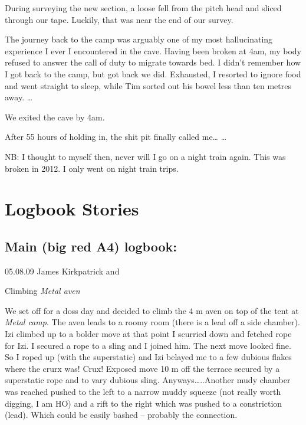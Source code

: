 During surveying the new section, a loose fell from the pitch head and
sliced through our tape. Luckily, that was near the end of our survey.

The journey back to the camp was arguably one of my most hallucinating
experience I ever I encountered in the cave. Having been broken at 4am,
my body refused to answer the call of duty to migrate towards bed. I
didn't remember how I got back to the camp, but got back we did.
Exhausted, I resorted to ignore food and went straight to sleep, while
Tim sorted out his bowel less than ten metres away. \ldots{}

We exited the cave by 4am.

After 55 hours of holding in, the shit pit finally called me\ldots{}
\ldots{}

NB: I thought to myself then, never will I go on a night train again.
This was broken in 2012. I only went on night train trips.


\hypertarget{logbook-stories}{%
\section{Logbook Stories}\label{logbook-stories}}

\hypertarget{main-big-red-a4-logbook}{%
\subsection{Main (big red A4) logbook:}\label{main-big-red-a4-logbook}}

05.08.09 James Kirkpatrick and \izi

Climbing \emph{Metal aven}

We set off for a doss day and decided to climb the 4 m aven on top of
the tent at \emph{Metal camp}. The aven leads to a roomy room (there is
a lead off a side chamber). Izi climbed up to a bolder move at that
point I scurried down and fetched rope for Izi. I secured a rope to a
sling and I joined him. The next move looked fine. So I roped up (with
the superstatic) and Izi belayed me to a few dubious flakes where the
crurx was! Crux! Exposed move 10 m off the terrace secured by a
superstatic rope and to vary dubious sling. Anyways\ldots{}..Another
mudy chamber was reached pushed to the left to a narrow muddy squeeze
(not really worth digging, I am HO) and a rift to the right which was
pushed to a constriction (lead). Which could be easily bashed --
probably the connection.

